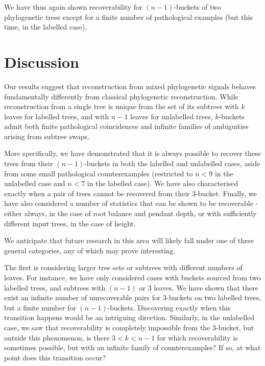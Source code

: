 \documentclass[12pt]{article}
\theoremstyle{definition}
\begin{document}
We have thus again shown recoverability for $(n-1)$-buckets of two phylogenetic trees except for a finite number of pathological examples (but this time, in the labelled case).

\clearpage

\section{Discussion}\label{s:discuss}

Our results suggest that reconstruction from mixed phylogenetic signals behaves fundamentally differently from classical phylogenetic reconstruction. While reconstruction from a single tree is unique from the set of its subtrees with $k$ leaves for labelled trees, and with $n-1$ leaves for unlabelled trees, $k$-buckets admit both finite pathological coincidences and infinite families of ambiguities arising from subtree swaps.

More specifically, we have demonstrated that it is always possible to recover these trees from their $(n-1)$-buckets in both the labelled and unlabelled cases, aside from some small pathological counterexamples (restricted to $n<9$ in the unlabelled case and $n<7$ in the labelled case). We have also characterised exactly when a pair of trees cannot be recovered from their $3$-bucket. Finally, we have also considered a number of statistics that can be shown to be recoverable - either always, in the case of root balance and pendant depth, or with sufficiently different input trees, in the case of height.

We anticipate that future research in this area will likely fall under one of three general categories, any of which may prove interesting. 

The first is considering larger tree sets or subtrees with different numbers of leaves. For instance, we have only considered cases with buckets sourced from two labelled trees, and subtrees with $(n-1)$ or $3$ leaves. We have shown that there exist an infinite number of unrecoverable pairs for $3$-buckets on two labelled trees, but a finite number for $(n-1)$-buckets. Discovering exactly when this transition happens would be an intriguing direction. Similarly, in the unlabelled case, we saw that recoverability is completely impossible from the $3$-bucket, but outside this phenomenon, is there $3<k<n-1$ for which recoverability is sometimes possible, but with an infinite family of counterexamples? If so, at what point does this transition occur?
\end{document}
